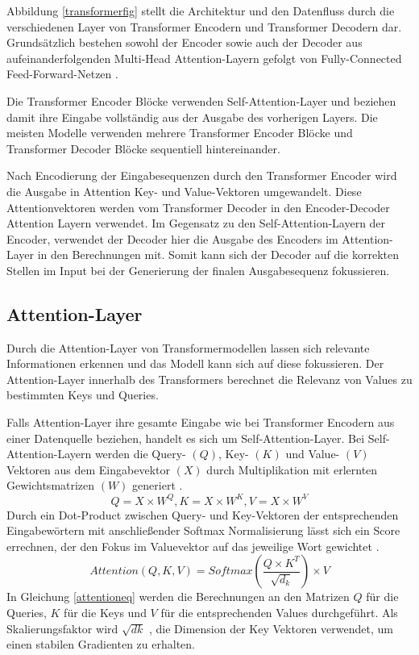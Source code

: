 Abbildung \ref{transformerfig} stellt die Architektur und den Datenfluss durch die verschiedenen Layer von Transformer Encodern und Transformer Decodern dar. 
Grundsätzlich bestehen sowohl der Encoder sowie auch der Decoder aus aufeinanderfolgenden Multi-Head Attention-Layern gefolgt von Fully-Connected Feed-Forward-Netzen \citep{AttentionIALYN}.


Die Transformer Encoder Blöcke verwenden Self-Attention-Layer und beziehen damit ihre Eingabe vollständig aus der Ausgabe des vorherigen Layers. 
Die meisten Modelle verwenden mehrere Transformer Encoder Blöcke und Transformer Decoder Blöcke sequentiell hintereinander.

Nach Encodierung der Eingabesequenzen durch den Transformer Encoder wird die Ausgabe in Attention Key- und Value-Vektoren umgewandelt.
Diese Attentionvektoren werden vom Transformer Decoder in den Encoder-Decoder Attention Layern verwendet.
Im Gegensatz zu den Self-Attention-Layern der Encoder, verwendet der Decoder hier die Ausgabe des Encoders im Attention-Layer in den Berechnungen mit.
Somit kann sich der Decoder auf die korrekten Stellen im Input bei der Generierung der finalen Ausgabesequenz fokussieren.






\subsection{Attention-Layer} %
\label{attention}
Durch die Attention-Layer von Transformermodellen lassen sich relevante Informationen erkennen und das Modell kann sich auf diese fokussieren. 
Der Attention-Layer innerhalb des Transformers berechnet die Relevanz von Values zu bestimmten Keys und Queries. 

Falls Attention-Layer ihre gesamte Eingabe wie bei Transformer Encodern aus einer Datenquelle beziehen, handelt es sich um Self-Attention-Layer.
Bei Self-Attention-Layern werden die Query- $(Q)$, Key- $(K)$ und Value- $(V)$ Vektoren aus dem Eingabevektor $(X)$ durch Multiplikation mit erlernten Gewichtsmatrizen $(W)$ generiert \citep{AttentionIALYN}. 
\begin{equation}
    Q = X \times W^{Q}, K = X \times W^{K}, V = X \times W^{V}
\end{equation}
Durch ein Dot-Product zwischen Query- und Key-Vektoren der entsprechenden Eingabewörtern mit anschließender Softmax Normalisierung lässt sich ein Score errechnen, der den Fokus im Valuevektor auf das jeweilige Wort gewichtet \citep{AttentionIALYN}.
\begin{equation}
    \label{attentioneq}
    Attention(Q,K,V) = Softmax(\frac{Q\times K^T}{\sqrt{d_k}})\times V
\end{equation}
In Gleichung \ref{attentioneq} werden die Berechnungen an den Matrizen $Q$ für die Queries, $K$ für die Keys und $V$ für die entsprechenden Values durchgeführt. Als Skalierungsfaktor wird $\sqrt{dk}$ , die Dimension der Key Vektoren verwendet, um einen stabilen Gradienten zu erhalten. 

